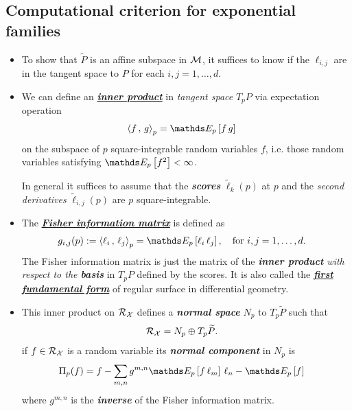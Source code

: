 \documentclass[11pt]{article}
\begin{document}
\subsection{Computational criterion for exponential families}
\begin{itemize}
\item To show that $\widetilde{P}$ is an affine subspace in ${\mathcal M}$, it suffices to know if the $\ell_{i,j}$ are in the tangent space to $P$ for each $i, j = 1, \ldots , d$.

\item \begin{definition}
We can define an \underline{\emph{\textbf{inner product}}} in \emph{tangent space} $T_{p}P$ via expectation operation
\begin{align}
\inn{f}{g}_{p} &= \E{p}{f\,g} \label{eqn: inn_prod_exp}
\end{align} on the subspace of $p$ square-integrable random variables $f$, i.e. those random variables satisfying $\E{p}{f^2} < \infty$. 
\end{definition} 

In general it suffices to assume that the \emph{\textbf{scores}} $\widetilde{\ell}_{k}(p)$ at $p$ and the \emph{second derivatives} $ \widetilde{\ell}_{i,j}(p)$ are $p$ square-integrable.

\item \begin{definition}
The \underline{\emph{\textbf{Fisher information matrix}}} is defined as
\begin{align}
g_{i,j}(p):= \inn{\ell_i}{\ell_j}_{p} &= \E{p}{\ell_i\, \ell_j}, \quad \text{for }i,j = 1, \ldots, d. \label{eqn: fisher_info}
\end{align} The Fisher information matrix is just the matrix of the \emph{\textbf{inner product} with respect to the \textbf{basis}} in $T_{p}P$ defined by the scores. It is also called the \underline{\emph{\textbf{first fundamental form}}} of regular surface in differential geometry.
\end{definition}

\item This inner product on ${\mathcal R}_{{\mathcal X}}$ defines a \emph{\textbf{normal space}} $N_p$ to $T_{p}\widetilde{P}$ such that
\begin{align}
{\mathcal R}_{{\mathcal X}} &= N_p \oplus T_{p}\widetilde{P}. \label{eqn: normal_tangent_decomp}
\end{align} if $f \in {\mathcal R}_{{\mathcal X}}$ is a random variable its \emph{\textbf{normal component}} in $N_p$ is
\begin{align}
\Pi_{p}(f) &= f - \sum_{m,n}g^{m,n}\E{p}{f\,\ell_{m}}\,\ell_{n} - \E{p}{f}  \label{eqn: normal_tangent_decomp2}
\end{align} where $g^{m,n}$ is the \emph{\textbf{inverse}} of the Fisher information matrix. 


\end{itemize}
\end{document}
